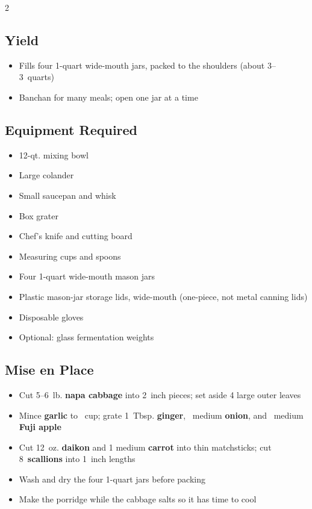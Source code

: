 \documentclass[11pt,letterpaper]{article}
\begin{document}
\newpage
{\footnotesize
\setlength{\columnsep}{20pt}
\setlength{\multicolsep}{6pt}
\begin{multicols}{2}
\setlength{\parindent}{0pt}
\setlength{\parskip}{2pt}
\setlength{\itemsep}{0pt}
\setlength{\parsep}{0pt}

\subsection*{Yield}
\begin{itemize}
    \item Fills four 1-quart wide-mouth jars, packed to the shoulders (about 3--3~quarts)
    \item Banchan for many meals; open one jar at a time
\end{itemize}

\subsection*{Equipment Required}
\begin{itemize}
    \item 12-qt. mixing bowl
    \item Large colander
    \item Small saucepan and whisk
    \item Box grater
    \item Chef's knife and cutting board
    \item Measuring cups and spoons
    \item Four 1-quart wide-mouth mason jars
    \item Plastic mason-jar storage lids, wide-mouth (one-piece, not metal canning lids)
    \item Disposable gloves
    \item Optional: glass fermentation weights
\end{itemize}

\subsection*{Mise en Place}
\begin{itemize}
    \item Cut 5--6~lb. \textbf{napa cabbage} into 2~inch pieces; set aside 4 large outer leaves
    \item Mince \textbf{garlic} to ~cup; grate 1~Tbsp. \textbf{ginger}, ~medium \textbf{onion}, and ~medium \textbf{Fuji apple}
    \item Cut 12~oz. \textbf{daikon} and 1 medium \textbf{carrot} into thin matchsticks; cut 8~\textbf{scallions} into 1~inch lengths
    \item Wash and dry the four 1-quart jars before packing
    \item Make the porridge while the cabbage salts so it has time to cool
\end{itemize}


\end{multicols}}
\end{document}

